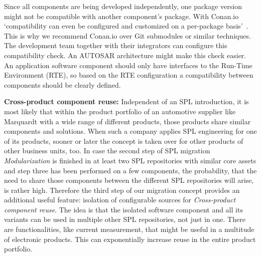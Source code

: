 Since all components are being developed independently, one package version
might not be compatible with another component's package. With Conan.io
`compatibility can even be configured and customized on a per-package
basis'~\cite{conandocs}. This is why we recommend Conan.io over Git submodules
or similar techniques. The development team together with their integrators can
configure this compatibility check. An AUTOSAR architecture might make this
check easier. An application software component should only have interfaces to
the Run-Time Environment (RTE), so based on the RTE configuration a
compatibility between components should be clearly defined.

\textbf{Cross-product component reuse:} Independent of an SPL introduction, it
is most likely that within the product portfolio of an automotive supplier like
Marquardt with a wide range of different products, those products share similar
components and solutions. When such a company applies SPL engineering for one of
its products, sooner or later the concept is taken over for other products of
other business units, too. In case the second step of SPL migration
\textit{Modularization} is finished in at least two SPL repositories with
similar core assets and step three has been performed on a few components, the
probability, that the need to share those components between the different SPL
repositories will arise, is rather high. Therefore the third step of our
migration concept provides an additional useful feature: isolation of
configurable sources for \textit{Cross-product component reuse}. The idea is
that the isolated software component and all its variants can be used in multiple
other SPL repositories, not just in one. There are functionalities, like current
measurement, that might be useful in a multitude of electronic products. This
can exponentially increase reuse in the entire product portfolio.
